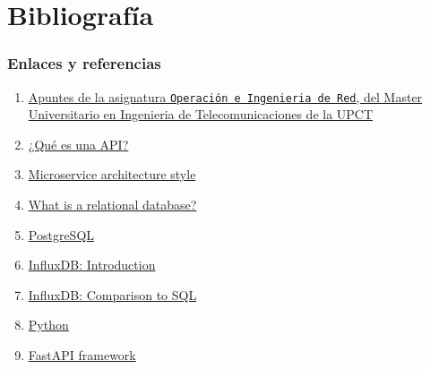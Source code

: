 \documentclass[a4paper, oneside, 12pt]{book}
\begin{document}
	\pagebreak
	
	\chapter{Bibliografía}
	
	\subsection*{Enlaces y referencias}
	
	\begin{enumerate}
		\item 
		\label{bib: apuntes OeIR}
		\href{https://teleco.upct.es/guia-docente/211101007}{Apuntes de la asignatura \texttt{Operación e Ingenieria de Red}, del Master Universitario en Ingenieria de Telecomunicaciones de la UPCT}
		
		\item
		\label{bib: what is api}
		\href{https://aws.amazon.com/es/what-is/api/}{¿Qué es una API?}
		
		\item
		\label{bib: microservices}
		\href{https://learn.microsoft.com/en-us/azure/architecture/guide/architecture-styles/microservices}{Microservice architecture style}
		
		\item
		\label{bib: relational database}
		\href{https://cloud.google.com/learn/what-is-a-relational-database}{What is a relational database?}
				
		\item
		\label{bib: postgresql}
		\href{https://www.postgresql.org/}{PostgreSQL}
		
		\item
		\label{bib: influxdb doc}
		\href{https://www.stackhero.io/en/services/InfluxDB/documentations/Introduction#differences-between-influxdb-and-relational-sql-databases}{InfluxDB: Introduction}
		
		\item
		\label{bib: influxdb doc vs sql}
		\href{https://archive.docs.influxdata.com/influxdb/v1.2/concepts/crosswalk/}{InfluxDB: Comparison to SQL}
		
		\item
		\label{bib: python doc}
		\href{https://www.python.org/}{Python}
		
		\item
		\label{bib: fastapi doc}
		\href{https://fastapi.tiangolo.com/}{FastAPI framework}
		

\end{enumerate}
\end{document}
